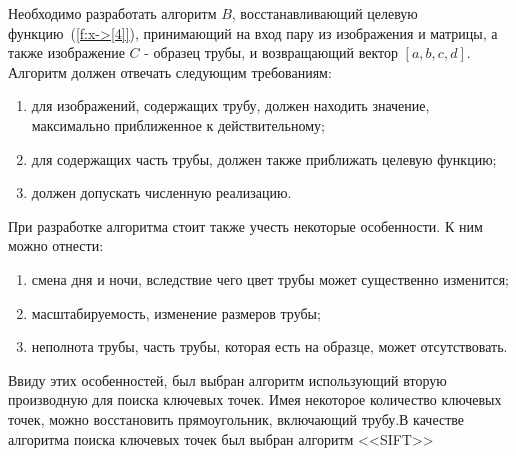 \documentclass[14pt, a4paper]{extreport}
\begin{document}
	Необходимо разработать алгоритм $B$, восстанавливающий целевую функцию~(\ref{f:x->[4]}), принимающий на вход пару из изображения и матрицы, а также изображение $C$ - образец трубы, и возвращающий вектор $[a, b, c, d]$. Алгоритм должен отвечать следующим требованиям:
	\begin{enumerate}[label={\arabic*)}]
		\item для изображений, содержащих трубу, должен находить значение, максимально приближенное к действительному;
		\item для содержащих часть трубы, должен также приближать целевую функцию;
		\item должен допускать численную реализацию.
	\end{enumerate}
	
	При разработке алгоритма стоит также учесть некоторые особенности. К ним можно отнести:
	\begin{enumerate}[label={\arabic*)}]
		\item смена дня и ночи, вследствие чего цвет трубы может существенно изменится;
		\item масштабируемость, изменение размеров трубы;
		\item неполнота трубы, часть трубы, которая есть на образце, может отсутствовать.
	\end{enumerate}
	Ввиду этих особенностей, был выбран алгоритм использующий вторую производную для поиска ключевых точек. Имея некоторое количество ключевых точек, можно восстановить прямоугольник, включающий трубу.\linebreak В качестве алгоритма поиска ключевых точек был выбран алгоритм <<SIFT>>
	
\end{document}
